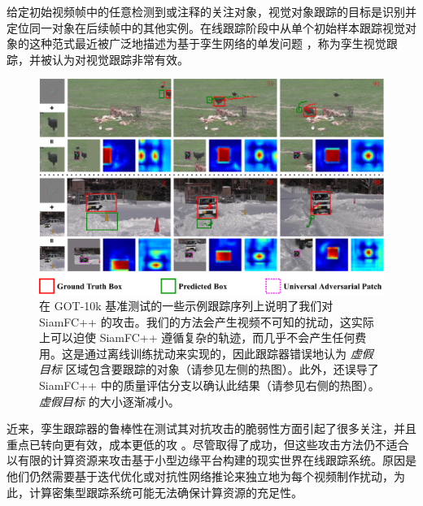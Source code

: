 给定初始视频帧中的任意检测到或注释的关注对象，视觉对象跟踪的目标是识别并定位同一对象在后续帧中的其他实例。在线跟踪阶段中从单个初始样本跟踪视觉对象的这种范式最近被广泛地描述为基于孪生网络的单发问题 \cite{SiamFC,SiamRPN,SiamRPN++,SiamFC++}，称为孪生视觉跟踪，并被认为对视觉跟踪非常有效。

\begin{figure}[thbp]
\centering
\includegraphics[width=1.0\textwidth]{Img/attack/1_v8.pdf}
\caption{在 GOT-10k 基准测试的一些示例跟踪序列上说明了我们对 SiamFC++ 的攻击。我们的方法会产生视频不可知的扰动，这实际上可以迫使 SiamFC++ 遵循复杂的轨迹，而几乎不会产生任何费用。这是通过离线训练扰动来实现的，因此跟踪器错误地认为 \textit{虚假目标} 区域包含要跟踪的对象（请参见左侧的热图）。此外，还误导了 SiamFC++ 中的质量评估分支以确认此结果（请参见右侧的热图）。\textit{虚假目标} 的大小逐渐减小。} 
\label{fig:1}
\end{figure}

近来，孪生跟踪器的鲁棒性在测试其对抗攻击的脆弱性方面引起了很多关注，并且重点已转向更有效，成本更低的攻 \cite{TTP,FAN,SPARK}。尽管取得了成功，但这些攻击方法仍不适合以有限的计算资源来攻击基于小型边缘平台构建的现实世界在线跟踪系统。原因是他们仍然需要基于迭代优化或对抗性网络推论来独立地为每个视频制作扰动，为此，计算密集型跟踪系统可能无法确保计算资源的充足性。

